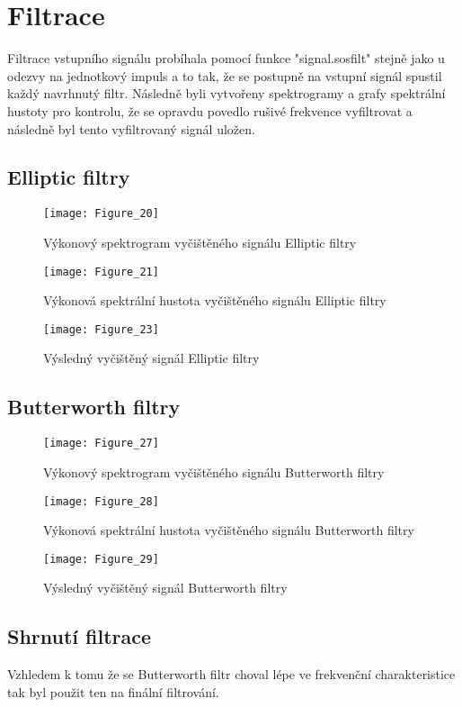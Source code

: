 \section{Filtrace}

Filtrace vstupního signálu probíhala pomocí funkce "signal.sosfilt" stejně jako u odezvy na jednotkový impuls a to tak, že se postupně na vstupní signál spustil každý navrhnutý filtr.
Následně byli vytvořeny spektrogramy a grafy spektrální hustoty pro kontrolu, že se opravdu povedlo rušivé frekvence vyfiltrovat a následně byl tento vyfiltrovaný signál uložen.

\subsection{Elliptic filtry}
\begin{figure}[H] 
	\centering
	\texttt{[image: Figure\_20]}
	\caption{Výkonový spektrogram vyčištěného signálu Elliptic filtry}
\end{figure}

\begin{figure}[H] 
	\centering
	\texttt{[image: Figure\_21]}
	\caption{Výkonová spektrální hustota vyčištěného signálu Elliptic filtry}
\end{figure}

\begin{landscape}
\begin{figure}[H] 
	\centering
	\texttt{[image: Figure\_23]}
	\caption{Výsledný vyčištěný signál Elliptic filtry}
\end{figure}
\end{landscape}

\subsection{Butterworth filtry}
\begin{figure}[H] 
	\centering
	\texttt{[image: Figure\_27]}
	\caption{Výkonový spektrogram vyčištěného signálu Butterworth filtry}
\end{figure}

\begin{figure}[H] 
	\centering
	\texttt{[image: Figure\_28]}
	\caption{Výkonová spektrální hustota vyčištěného signálu Butterworth filtry}
\end{figure}

\begin{landscape}
\begin{figure}[H] 
	\centering
	\texttt{[image: Figure\_29]}
	\caption{Výsledný vyčištěný signál Butterworth filtry}
\end{figure}
\end{landscape}

\subsection{Shrnutí filtrace}
Vzhledem k tomu že se Butterworth filtr choval lépe ve frekvenční charakteristice tak byl použit ten na finální filtrování.